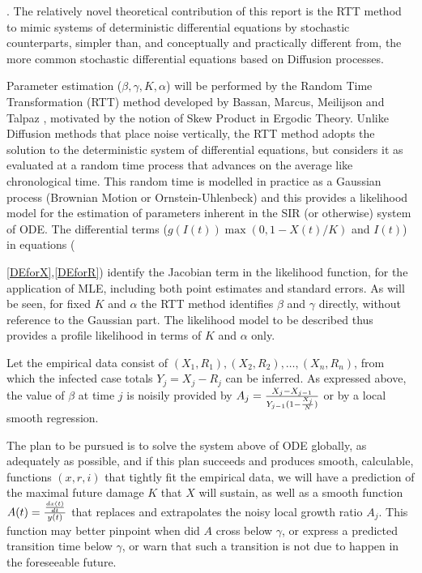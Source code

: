 \documentclass{article}
\begin{document}
\bigskip

. The relatively novel theoretical contribution of this report is the RTT method to mimic systems of deterministic differential equations by stochastic counterparts, simpler than, and conceptually and practically different from, the more common stochastic differential equations based on Diffusion processes.

Parameter estimation ($\beta, \gamma, K, \alpha$) will be performed by the Random Time Transformation (RTT) method developed by Bassan, Marcus, Meilijson and Talpaz \cite{Bassanetal}, motivated by the notion of Skew Product in Ergodic Theory. Unlike Diffusion methods that place noise vertically, the RTT method adopts the solution to the deterministic system of differential equations, but considers it as evaluated at a random time process that advances on the average like chronological time. This random time is modelled in practice as a Gaussian process (Brownian Motion or Ornstein-Uhlenbeck) and this provides a likelihood model for the estimation of parameters inherent in the SIR (or otherwise) system of ODE. The differential terms ($g(I(t)) \max(0,1 - X(t)/K)$ and $I(t)$) in equations ({\ref{DEforX},\ref{DEforR}) identify the Jacobian term in the likelihood function, for the application of MLE, including both point estimates and standard errors. As will be seen, for fixed $K$ and $\alpha$ the RTT method identifies $\beta$ and $\gamma$ directly, without reference to the Gaussian part. The likelihood model to be described thus provides a profile likelihood in terms of $K$ and $\alpha$ only.

\bigskip

Let the empirical data consist of $(X_1,R_1), (X_2,R_2), \dots, (X_n, R_n)$, from which the infected case totals $Y_j=X_j-R_j$ can be inferred. As expressed above, the value of $\beta$ at time $j$ is noisily provided by $A_j={{X_j-X_{j-1}} \over {Y_{j-1}(1-{{X_j} \over N})}}$ or by a local smooth regression.

The plan to be pursued is to solve the system above of ODE globally, as adequately as possible, and if this plan succeeds and produces smooth, calculable, functions $(x,r,i)$ that tightly fit the empirical data, we will have a prediction of the maximal future damage $K$ that $X$ will sustain, as well as a smooth function $A(t)={{{dx(t)} \over {dt}} \over {y(t)}}$ that replaces and extrapolates the noisy local growth ratio $A_j$. This function may better pinpoint when did $A$ cross below $\gamma$, or express a predicted transition time below $\gamma$, or warn that such a transition is not due to happen in the foreseeable future.

}
\end{document}

